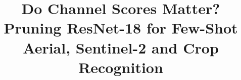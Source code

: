 \title{Do Channel Scores Matter? Pruning ResNet-18 for Few-Shot Aerial, Sentinel-2 and Crop Recognition}
